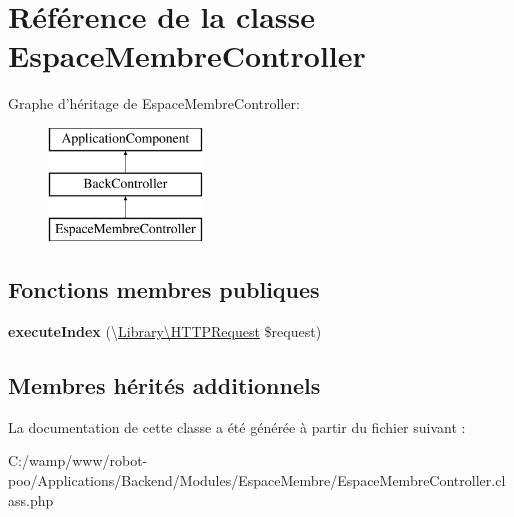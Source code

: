 \hypertarget{class_applications_1_1_backend_1_1_modules_1_1_espace_membre_1_1_espace_membre_controller}{\section{Référence de la classe Espace\+Membre\+Controller}
\label{class_applications_1_1_backend_1_1_modules_1_1_espace_membre_1_1_espace_membre_controller}
}
Graphe d'héritage de Espace\+Membre\+Controller\+:\begin{figure}[H]
\begin{center}
\leavevmode
\includegraphics[height=3.000000cm]{class_applications_1_1_backend_1_1_modules_1_1_espace_membre_1_1_espace_membre_controller}
\end{center}
\end{figure}
\subsection*{Fonctions membres publiques}
\begin{DoxyCompactItemize}
\item 
\hypertarget{class_applications_1_1_backend_1_1_modules_1_1_espace_membre_1_1_espace_membre_controller_ac9c6fe801e9ac09e4a395ad64c76ed04}{{\bfseries execute\+Index} (\textbackslash{}\hyperlink{class_library_1_1_h_t_t_p_request}{Library\textbackslash{}\+H\+T\+T\+P\+Request} \$request)}\label{class_applications_1_1_backend_1_1_modules_1_1_espace_membre_1_1_espace_membre_controller_ac9c6fe801e9ac09e4a395ad64c76ed04}

\end{DoxyCompactItemize}
\subsection*{Membres hérités additionnels}


La documentation de cette classe a été générée à partir du fichier suivant \+:\begin{DoxyCompactItemize}
\item 
C\+:/wamp/www/robot-\/poo/\+Applications/\+Backend/\+Modules/\+Espace\+Membre/Espace\+Membre\+Controller.\+class.\+php\end{DoxyCompactItemize}

